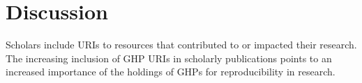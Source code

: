 \chapter{Discussion}
\label{ch:discussion}


Scholars include URIs to resources that contributed to or impacted their research. The increasing inclusion of GHP URIs in scholarly publications points to an increased importance of the holdings of GHPs for reproducibility in research.